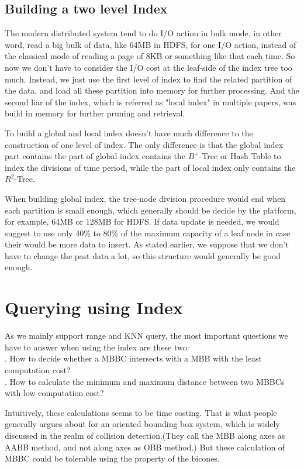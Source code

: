 \documentclass[sigplan]{acmart}
\begin{document}
\subsection{Building a two level Index}
The modern distributed system tend to do I/O action in bulk mode, in other word, read a big bulk of data, like 64MB in HDFS, for one I/O action, instead of the classical mode of reading a page of 8KB or something like that each time. So now we don't have to consider the I/O cost at the leaf-side of the index tree too much. Instead, we just use the first level of index to find the related partition of the data, and load all these partition into memory for further processing. And the second liar of the index, which is referred as "local index" in multiple papers, was build in memory for further pruning and retrieval. \par
To build a global and local index doesn't have much difference to the construction of one level of index. The only difference is that the global index part contains the part of global index contains the $B^+$-Tree or Hash Table to index the divisions of time period, while the part of local index only contains the $R^2$-Tree.\par
When building global index, the tree-node division procedure would end when each partition is small enough, which generally should be decide by the platform, for example, 64MB or 128MB for HDFS. If data update is needed, we would suggest to use only 40\% to 80\% of the maximum capacity of a leaf node in case their would be more data to insert. As stated earlier, we suppose that we don't have to change the past data a lot, so this structure would generally be good enough. \par



\section{Querying using Index} \label{sec:query}
As we mainly support range and KNN query, the most important questions we have to answer when using the index are these two:\\
. How to decide whether a MBBC intersects with a MBB with the least computation cost?\\
. How to calculate the minimum and maximum distance between two MBBCs with low computation cost?\par
Intuitively, these calculations seems to be time costing. That is what people generally argues about for an oriented bounding box system, which is widely discussed in the realm of collision detection.(They call the MBB along axes as AABB method, and not along axes as OBB method.) But these calculation of MBBC could be tolerable using the property of the bicones.\par
\end{document}
